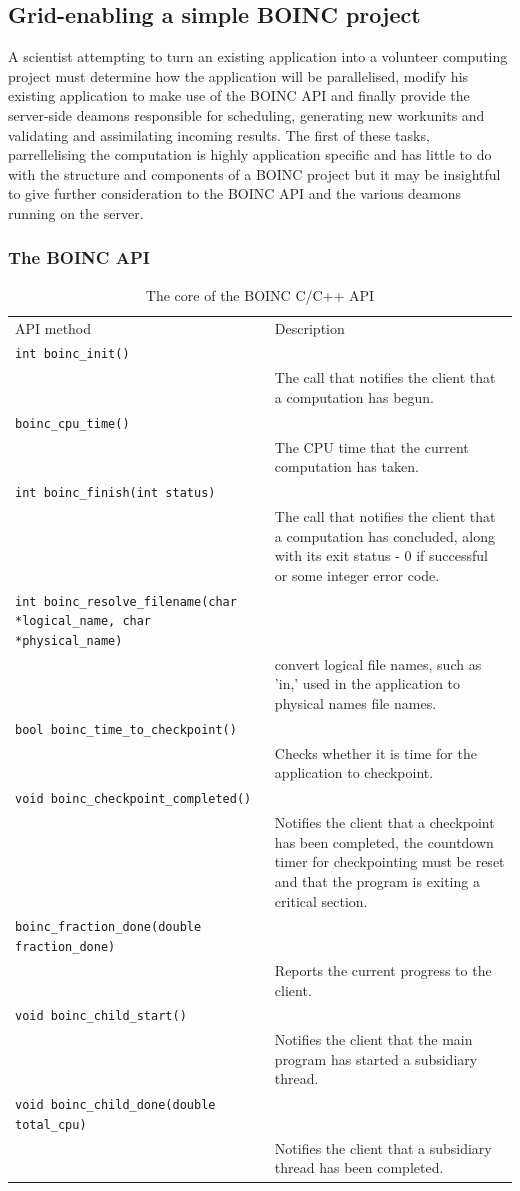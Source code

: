 \subsection{Grid-enabling a simple BOINC project}
A scientist attempting to turn an existing application into a volunteer computing project must  determine how the application will be parallelised, modify his existing application to make use of the BOINC API and finally provide the server-side deamons responsible for scheduling,  generating new workunits and validating and assimilating incoming results.
The first of these tasks, parrellelising the computation is highly application specific and has little to do with the structure and components of a BOINC project but it may be insightful to give further consideration to the BOINC API and the various deamons running on the server.
\subsubsection{The BOINC API}
\begin{table}[htb] \centering
\caption{The core of the BOINC C/C++ API \cite{boincwiki}}
\begin{tabular}{p{2.5cm}p{11.6cm}}\toprule
 API method & Description\\ \cmidrule(r){1-2}
 \verb|int boinc_init()|\\ & The call that notifies the client that a computation has begun.\\
\verb|boinc_cpu_time()| \\ & The CPU time that the current computation has taken.\\
\verb|int boinc_finish(int status)| \\ & The call that notifies the client that a computation has concluded, along with its exit status - 0 if successful or some integer error code.\\
\verb|int boinc_resolve_filename(char *logical_name, char *physical_name)| \\ & convert logical file names, such as 'in,' used in the application to physical names file names. \\ 
\verb|bool boinc_time_to_checkpoint()| \\ & Checks whether it is time for the application to checkpoint.\\
\verb|void boinc_checkpoint_completed()| \\ & Notifies the client that a checkpoint has been completed, the countdown timer for checkpointing must be reset and that the program is exiting a critical section. 
\\ 
\verb|boinc_fraction_done(double fraction_done)| \\ & Reports the current progress to the client. \\ 
\verb|void boinc_child_start()| \\ & Notifies the client that the main program has started a subsidiary thread.\\
\verb|void boinc_child_done(double total_cpu)| \\ & Notifies the client that   a subsidiary thread has been completed. 
\\ \bottomrule
\end{tabular}\label{tab:api}
\end{table}
